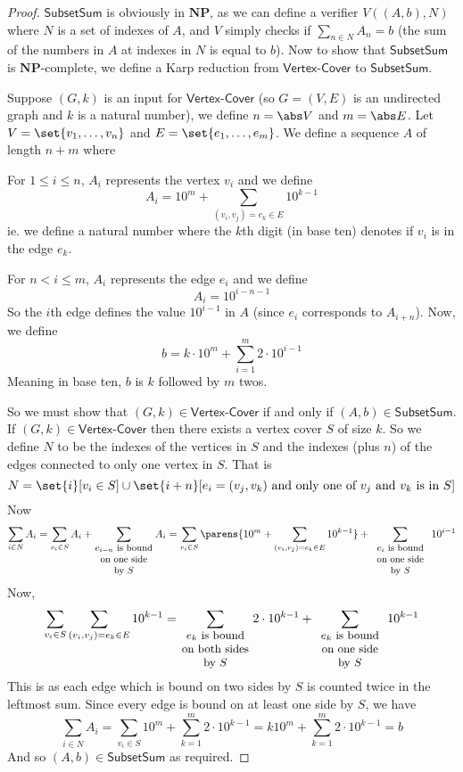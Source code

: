 \documentclass[10pt]{article}
\def\undersumtext#1{\vtop{\hsize=2cm\relax\centering\small #1}}
\def\vertcover{\textsf{Vertex-Cover}}
\def\subsum{\mathsf{SubsetSum}}
\def\NP{\mathbf{NP}}
\begin{document}
\begin{proof}

    $\subsum$ is obviously in $\NP$, as we can define a verifier $V((A,b),N)$ where $N$ is a set of indexes of $A$, and $V$ simply checks if $\sum_{n\in N}A_n=b$ (the sum of the numbers in $A$ at indexes in
    $N$ is equal to $b$).
    Now to show that $\subsum$ is $\NP$-complete, we define a Karp reduction from $\vertcover$ to $\subsum$.

    Suppose $(G,k)$ is an input for $\vertcover$ (so $G=(V,E)$ is an undirected graph and $k$ is a natural number), we define $n=\abs V$ and $m=\abs E$.
    Let $V=\set{v_1,\dots,v_n}$ and $E=\set{e_1,\dots,e_m}$.
    We define a sequence $A$ of length $n+m$ where
    \benum
        \item For $1\leq i\leq n$, $A_i$ represents the vertex $v_i$ and we define
        \[ A_i = 10^m + \sum_{(v_i,v_j)=e_k\in E}10^{k-1} \]
        ie. we define a natural number where the $k$th digit (in base ten) denotes if $v_i$ is in the edge $e_k$.
        \item For $n<i\leq m$, $A_i$ represents the edge $e_i$ and we define
        \[ A_i = 10^{i-n-1} \]
        So the $i$th edge defines the value $10^{i-1}$ in $A$ (since $e_i$ corresponds to $A_{i+n}$).
    \eenum
    Now, we define
    \[ b = k\cdot10^m + \sum_{i=1}^m2\cdot10^{i-1} \]
    Meaning in base ten, $b$ is $k$ followed by $m$ twos.

    So we must show that $(G,k)\in\vertcover$ if and only if $(A,b)\in\subsum$.
    If $(G,k)\in\vertcover$ then there exists a vertex cover $S$ of size $k$.
    So we define $N$ to be the indexes of the vertices in $S$ and the indexes (plus $n$) of the edges connected to only one vertex in $S$.
    That is
    \[ N = \set{i}[v_i\in S]\cup\set{i+n}[e_i=(v_j,v_k)\text{ and only one of $v_j$ and $v_k$ is in $S$}] \]
    Now
    \[ \sum_{i\in N}A_i = \sum_{v_i\in S}A_i + \sum_{\vtop{\hsize=2cm\relax\centering\small $e_{i-n}$ is  bound on one side by $S$}} A_i = \sum_{v_i\in S}\parens{10^m + \sum_{(v_i,v_j)=e_k\in E}10^{k-1}} +
    \sum_{\vtop{\hsize=2cm\relax\centering\small $e_{i}$ is  bound on one side by $S$}}10^{i-1} \]
    Now,
    \[ \sum_{v_i\in S}\sum_{(v_i,v_j)=e_k\in E}10^{k-1} = \sum_{\undersumtext{$e_k$ is bound on both sides by $S$}}2\cdot10^{k-1} + \sum_{\undersumtext{$e_k$ is bound on one side by $S$}}10^{k-1} \]
    This is as each edge which is bound on two sides by $S$ is counted twice in the leftmost sum.
    Since every edge is bound on at least one side by $S$, we have
    \[ \sum_{i\in N}A_i = \sum_{v_i\in S}10^m + \sum_{k=1}^m2\cdot10^{k-1} = k10^m + \sum_{k=1}^m2\cdot10^{k-1} = b \]
    And so $(A,b)\in\subsum$ as required.


\end{proof}
\end{document}
